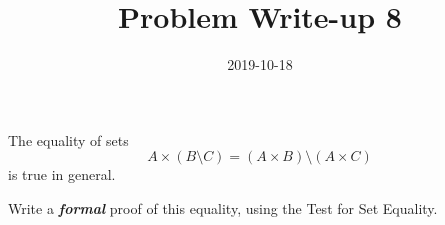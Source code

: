 \documentclass[a4paper,12pt]{article}
\title{Problem Write-up 8}
\date{2019-10-18}
\begin{document}
	\begin{problem}
		The equality of sets \[A \times (B \setminus C) = (A \times B) \setminus (A \times C)\] is true in general.
		
		Write a \textbf{\textit{formal}} proof of this equality, using the Test for Set Equality.	
	\end{problem}
	\begin{answer}
		
	\end{answer}
\end{document}
